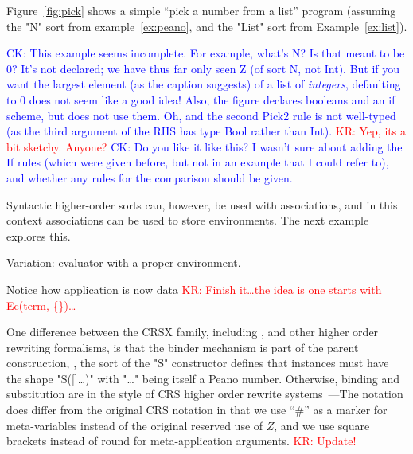 \documentclass[letterpaper,11pt]{article}
\newcommand{\CK}[1]{\textcolor{blue}{CK: #1}}
\newcommand{\KR}[1]{\textcolor{red}{KR: #1}}
\begin{document}
\begin{example}[]\label{ex:pick}
  Figure~\ref{fig:pick} shows a simple ``pick a number from a list'' program
  (assuming the "N" sort from example~\ref{ex:peano}, and the "List" sort from
  Example~\ref{ex:list}).

  \CK{This example seems incomplete.  For example, what's N? Is that meant to
  be 0? It's not declared; we have thus far only seen Z (of sort N, not Int).
  But if you want the largest element (as the caption suggests) of a list of
  \emph{integers}, defaulting to 0 does not seem like a good idea!  Also, the
  figure declares booleans and an if scheme, but does not use them.  Oh, and
  the second Pick2 rule is not well-typed (as the third argument of the RHS
  has type Bool rather than Int).}
  \KR{Yep, its a bit sketchy. Anyone?}
  \CK{Do you like it like this? I wasn't sure about adding the If rules (which
  were given before, but not in an example that I could refer to), and whether
  any rules for the comparison should be given.}
\end{example}

Syntactic higher-order sorts can, however, be used with associations, and in this context
associations can be used to store environments. The next example explores this.

\begin{example}
  Variation: evaluator with a proper environment. 
  Notice how application is now data
  \KR{Finish it…the idea is one starts with Ec(term, \{\})…}
\end{example}

\begin{remark}
  One difference between the CRSX family, including \hax, and other higher order rewriting
  formalisms, is that the binder mechanism is part of the parent construction, \eg, the sort of the
  "S" constructor defines that instances must have the shape "S([]…)" with "…" being itself a Peano
  number.  Otherwise, binding and substitution are in the style of CRS higher order rewrite
  systems~\cite{Klop+:tcs1993}---The notation does differ from the original CRS notation in that we
  use ``\#'' as a marker for meta-variables instead of the original reserved use of $Z$, and we use
  square brackets instead of round for meta-application arguments. \KR{Update!}
\end{remark}
\end{document}
